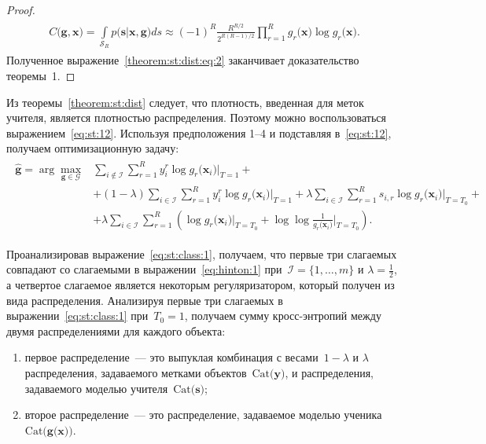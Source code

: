 \documentclass{dissert}
\begin{document}
\begin{proof}
	\begin{gather}
	\label{theorem:st:dist:eq:2}
	\begin{aligned}
		C\bigr(\mathbf{g}, \mathbf{x}\bigr) = \int\limits_{\mathcal{S}_R}p\bigr(\mathbf{s}|\mathbf{x}, \mathbf{g}\bigr)ds \approx \left(-1\right)^{R}\frac{R^{R/2}}{2^{R(R-1)/2}}\prod_{r=1}^{R}g_r\bigr(\mathbf{x}\bigr)\log g_r\bigr(\mathbf{x}\bigr).
	\end{aligned}
	\end{gather}
Полученное выражение~\eqref{theorem:st:dist:eq:2} заканчивает доказательство теоремы~1.
\end{proof}

Из теоремы~\ref{theorem:st:dist} следует, что плотность, введенная для меток учителя, является плотностью распределения. Поэтому можно воспользоваться выражением~\eqref{eq:st:12}.
Используя предположения 1--4 и подставляя в~\eqref{eq:st:12}, получаем  оптимизационную задачу:
\begin{gather}
\label{eq:st:class:1}
\begin{aligned}
\hat{\mathbf{g}} = \arg\max_{\mathbf{g}\in \mathcal{G}} & \sum_{i\not\in \mathcal{I}}\sum_{r=1}^{R}y_i^r\log g_r\bigr(\mathbf{x}_i\bigr)\bigr|_{T=1} +\\
&+ \left(1-\lambda\right)\sum_{i\in \mathcal{I}}\sum_{r=1}^{R}y_i^r\log g_r\bigr(\mathbf{x}_i\bigr)\bigr|_{T=1} + \lambda\sum_{i\in \mathcal{I}}\sum_{r=1}^{R}s_{i,r}\log g_r\bigr(\mathbf{x}_i\bigr)\bigr|_{T=T_0} +\\
&+ \lambda \sum_{i\in \mathcal{I}}\sum_{r=1}^{R}\left(\log g_r\bigr(\mathbf{x}_i\bigr)\bigr|_{T=T_0} + \log\log\frac{1}{g_r\bigr(\mathbf{x}_i\bigr)}\bigr|_{T=T_0}\right).
\end{aligned}
\end{gather}

Проанализировав выражение~\eqref{eq:st:class:1}, получаем, что первые три слагаемых совпадают со слагаемыми в выражении~\eqref{eq:hinton:1} при~$\mathcal{I} = \{1, \ldots, m\}$ и $\lambda=\frac{1}{2}$, а четвертое слагаемое является некоторым регуляризатором, который получен из вида распределения. Анализируя первые три слагаемых в выражении~\eqref{eq:st:class:1} при~$T_0 = 1$, получаем сумму кросс-энтропий между двумя распределениями для каждого объекта:
\begin{enumerate}[1)]
	\item первое распределение~--- это выпуклая комбинация с весами~$1-\lambda$ и $\lambda$ распределения, задаваемого метками объектов~$\text{Cat}\bigr(\mathbf{y}\bigr)$, и распределения, задаваемого моделью учителя~$\text{Cat}\bigr(\mathbf{s}\bigr)$;
	\item второе распределение~--- это распределение, задаваемое моделью ученика~$\text{Cat}\bigr(\mathbf{g}\bigr(\mathbf{x}\bigr)\bigr)$.
\end{enumerate}
\end{document}
